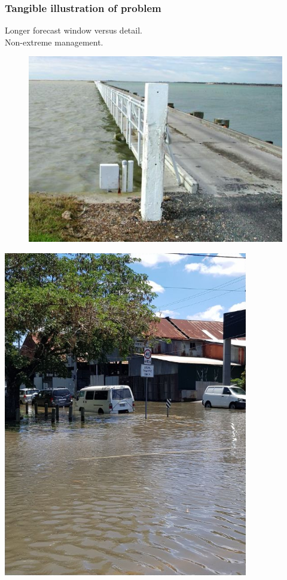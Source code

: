 \begin{frame}
\frametitle{Tangible illustration of problem}
Longer forecast window versus detail.\\
Non-extreme management.\\
\begin{minipage}{0.4\textwidth}
    \begin{figure}      
    \includegraphics[height=0.4\textheight]{figures/images/goolwa_ewe_island-environment_sa_gov_au.jpg}
    \end{figure}
\end{minipage}
\hfill
\begin{minipage}{0.4\textwidth}
    \centering
     \includegraphics[width=0.8\textwidth]{figures/images/sunnyFlood_ClarkJan2018Brisbane.png} 
\end{minipage}

\end{frame}
